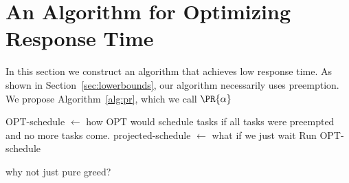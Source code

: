 \section{An Algorithm for Optimizing Response Time}
\label{sec:responsetime}

In this section we construct an algorithm that achieves low
response time. As shown in Section~\ref{sec:lowerbounds}, our
algorithm necessarily uses preemption.
We propose Algorithm~\ref{alg:pr}, which we call $\PR{\alpha}$
\begin{algorithm}
  \caption{$\PR{\alpha}$}
  \label{alg:pr}
  \begin{algorithmic}
      \State OPT-schedule $\gets$ how OPT would schedule tasks if
      all tasks were preempted and no more tasks come.
      \State projected-schedule $\gets$ what if we just wait
        \State Run OPT-schedule
      \EndIf
    \EndWhile
  \end{algorithmic}
\end{algorithm}

why not just pure greed?


